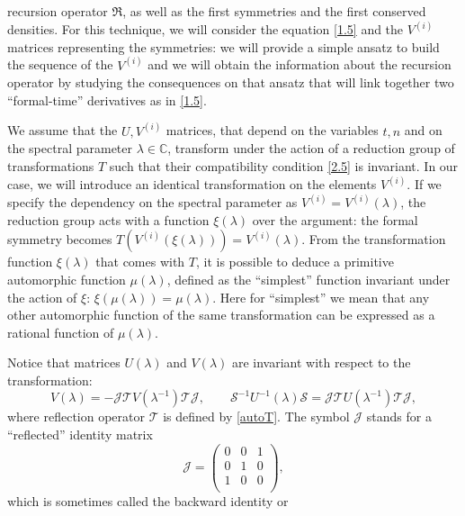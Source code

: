 \documentclass{article}
\numberwithin{equation}{section}
\newcommand\cS{{\mathcal S}}
\newcommand\cT{{\mathcal T}}
\begin{document}
recursion operator $\mathfrak{R}$, as well as the first symmetries and the first 
conserved densities.
	For this technique, we will consider the equation \eqref{1.5} and the 
$V^{(i)}$ matrices representing the symmetries: we will provide a simple ansatz 
to build the sequence of the $V^{(i)}$ and we will obtain the information about 
the recursion operator by studying the consequences on that ansatz that will 
link together two ``formal-time'' derivatives as in \eqref{1.5}.\par
	We assume that the $U, V^{(i)}$ matrices, that depend on the variables 
$t,n$ and on the spectral parameter $\lambda \in \mathbb{C}$, transform under 
the action of a reduction group \cite{31} of transformations $T$ such that their 
compatibility condition \eqref{2.5} is invariant. In our case, we will introduce 
an identical transformation on the elements $V^{(i)}$.
	If we specify the dependency on the spectral parameter as $V^{(i)} = 
V^{(i)}(\lambda)$, the reduction group acts with a function $\xi(\lambda)$ over 
the argument: the formal symmetry becomes $T(V^{(i)}(\xi(\lambda))) = 
V^{(i)}(\lambda)$.
	From the transformation function $\xi(\lambda)$ that comes with $T$, it 
is possible to deduce a primitive automorphic function $\mu(\lambda)$, defined 
as the ``simplest'' function invariant under the action of $\xi$: 
$\xi(\mu(\lambda))=\mu(\lambda)$. Here for ``simplest'' we mean that any other 
automorphic function of the same transformation can be expressed as a rational 
function of $\mu(\lambda)$.\par
\fi
Notice that matrices $U(\lambda)$ and $V(\lambda)$ are invariant with respect to the
transformation:
	\begin{equation}
		 V(\lambda)=  - \mathcal{J} \mathcal{T} V(\lambda^{-1}) 
\mathcal{T} \mathcal{J},\qquad \cS^{-1} U^{-1}(\lambda)\cS=  \mathcal{J} \cT U(\lambda^{-1}) \cT  \mathcal{J},
		\label{2.9bis}
	\end{equation}
where reflection operator $\mathcal{T}$ is defined by \eqref{autoT}.
	The symbol $\mathcal{J}$ stands for a ``reflected'' identity matrix
	\begin{equation*}
		\mathcal{J} = \begin{pmatrix}
			0 & 0 & 1\\
			0 & 1 & 0\\
			1 & 0 & 0\\
		\end{pmatrix},
		\label{2.8tris}
	\end{equation*}
which is sometimes called the backward identity or 
\end{document}
